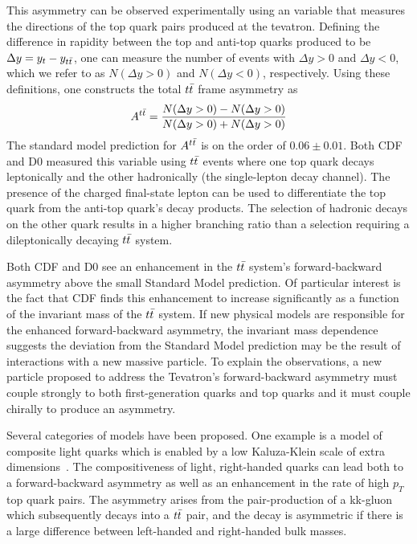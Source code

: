 This asymmetry can be observed experimentally using an variable that measures the directions of the top quark pairs produced at the tevatron.
Defining the difference in rapidity between the top and anti-top quarks produced to be $\Delta y = y_{t} - y_{t\bar{t}}$, one can measure the number of events with $\Delta y>0$ and $\Delta y<0$, which we refer to as $N(\Delta y>0)$ and $N(\Delta y < 0)$, respectively.
Using these definitions, one constructs the total $t\bar{t}$ frame asymmetry as
\begin{equation}
  \label{eq:FB_Asymmetry}
  A^{t\bar{t}} = \frac{N(\Delta y>0) - N(\Delta y>0)}{N(\Delta y>0) + N(\Delta y>0)}
\end{equation}
The standard model prediction for $A^{t\bar{t}}$ is on the order of $0.06 \pm 0.01$.%
Both CDF and D0 measured this variable using $t\bar{t}$ events where one top quark decays leptonically and the other hadronically (the single-lepton decay channel).
The presence of the charged final-state lepton can be used to differentiate the top quark from the anti-top quark's decay products.
The selection of hadronic decays on the other quark results in a higher branching ratio than a selection requiring a dileptonically decaying $t\bar{t}$ system.

Both CDF and D0 see an enhancement in the $t\bar{t}$ system's forward-backward asymmetry above the small Standard Model prediction.
Of particular interest is the fact that CDF finds this enhancement to increase significantly as a function of the invariant mass of the $t\bar{t}$ system.
If new physical models are responsible for the enhanced forward-backward asymmetry, the invariant mass dependence suggests the deviation from the Standard Model prediction may be the result of interactions with a new massive particle. %
To explain the observations, a new particle proposed to address the Tevatron's forward-backward asymmetry must couple strongly to both first-generation quarks and top quarks and it must couple chirally to produce an asymmetry.

Several categories of models have been proposed.
One example is a model of composite light quarks which is enabled by a low Kaluza-Klein scale of extra dimensions~\cite{Delaunay:2011et}.  %
The compositiveness of light, right-handed quarks can lead both to a forward-backward asymmetry as well as an enhancement in the rate of high $p_T$ top quark pairs.
The asymmetry arises from the pair-production of a kk-gluon which subsequently decays into a $t\bar{t}$ pair, and the decay is asymmetric if there is a large difference between left-handed and right-handed bulk masses.

